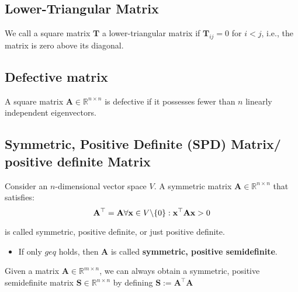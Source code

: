 
\subsection{Lower-Triangular Matrix \cite{mfml-1}}\label{Lower-Triangular Matrix}
We call a square matrix $\mathbf{T}$ a lower-triangular matrix if $\mathbf{T}_{ij} = 0$ for $i < j$, i.e., the matrix is zero above its diagonal.


\subsection{Defective matrix \cite{mfml-1}}\label{Defective matrix}
A square matrix $\mathbf{A} \in \mathbb{R}^{n\times n}$ is defective if it possesses fewer than $n$ linearly independent eigenvectors.


\subsection{Symmetric, Positive Definite (SPD) Matrix/ positive definite Matrix \cite{mfml-1}}\label{Symmetric, Positive Definite (SPD) Matrix/ positive definite Matrix}

Consider an $n$-dimensional vector space $V$. A symmetric matrix $\mathbf{A} \in \mathbb{R}^{n\times n}$ that satisfies:
\[
    \displaystyle
    \hfill
    \mathbf{A^\top = A}
    \hfill
    \forall \mathbf{x} \in V \backslash \{ 0 \} : \mathbf{x^\top A x} > 0
    \hfill
\]

is called symmetric, positive definite, or just positive definite. 

\begin{itemize}
    \item If only $geq$ holds, then $\mathbf{A}$ is called \textbf{symmetric, positive semidefinite}.
    
\end{itemize}

\begin{theorem}
    Given a matrix $\mathbf{A} \in \mathbb{R}^{m\times n}$, we can always obtain a symmetric, positive semidefinite matrix $\mathbf{S} \in \mathbb{R}^{n\times n}$ by defining $\mathbf{S := A^\top A}$
\end{theorem}

